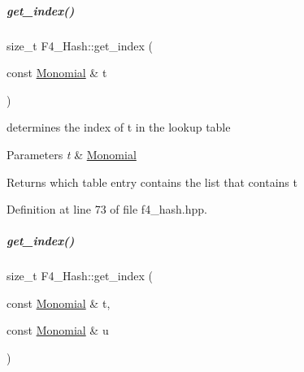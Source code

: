 \mbox{\label{group___g_b_computation_a7b22f6999f276e58087fe668a01f240a}} 
\subparagraph{\texorpdfstring{get\+\_\+index()}{get\_index()}\hspace{0.1cm}{\footnotesize\ttfamily [1/3]}}
{\footnotesize\ttfamily size\+\_\+t F4\+\_\+\+Hash\+::get\+\_\+index (\begin{DoxyParamCaption}\item[{const \hyperlink{group__polygroup_class_monomial}{Monomial} \&}]{t }\end{DoxyParamCaption})\hspace{0.3cm}{\ttfamily [inline]}}



determines the index of {\ttfamily t} in the lookup table 


\begin{DoxyParams}{Parameters}
{\em t} & {\ttfamily \hyperlink{group__polygroup_class_monomial}{Monomial}} \\
\hline
\end{DoxyParams}
\begin{DoxyReturn}{Returns}
which table entry contains the list that contains {\ttfamily t} 
\end{DoxyReturn}


Definition at line 73 of file f4\+\_\+hash.\+hpp.

\mbox{\label{group___g_b_computation_a12cff698cefa0375ab76ee6c36a0ce6c}} 
\subparagraph{\texorpdfstring{get\+\_\+index()}{get\_index()}\hspace{0.1cm}{\footnotesize\ttfamily [2/3]}}
{\footnotesize\ttfamily size\+\_\+t F4\+\_\+\+Hash\+::get\+\_\+index (\begin{DoxyParamCaption}\item[{const \hyperlink{group__polygroup_class_monomial}{Monomial} \&}]{t,  }\item[{const \hyperlink{group__polygroup_class_monomial}{Monomial} \&}]{u }\end{DoxyParamCaption})\hspace{0.3cm}{\ttfamily [inline]}}



